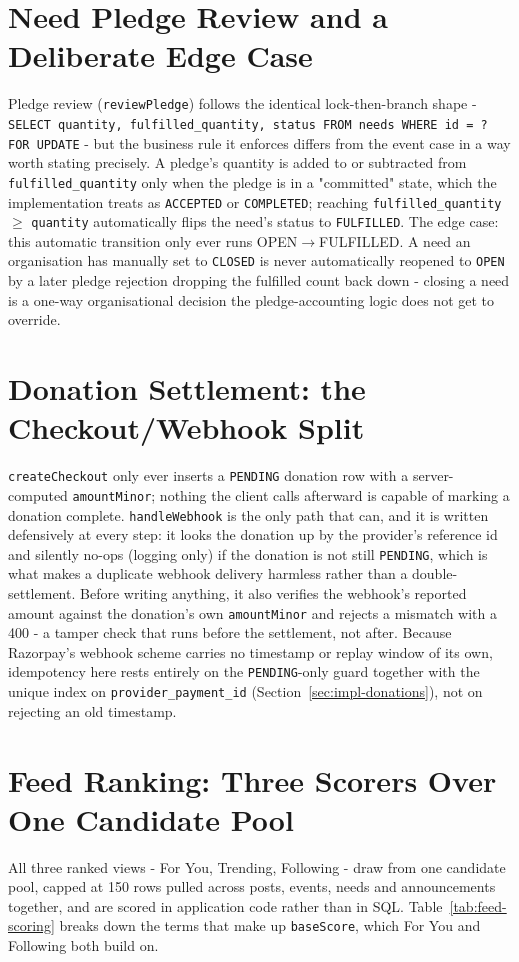 \section{Need Pledge Review and a Deliberate Edge Case}
\label{sec:deepdive-needs}
Pledge review (\texttt{reviewPledge}) follows the identical lock-then-branch shape - \texttt{SELECT quantity, fulfilled\_quantity, status FROM needs WHERE id = ? FOR UPDATE} - but the business rule it enforces differs from the event case in a way worth stating precisely. A pledge's quantity is added to or subtracted from \texttt{fulfilled\_quantity} only when the pledge is in a "committed" state, which the implementation treats as \texttt{ACCEPTED} or \texttt{COMPLETED}; reaching \texttt{fulfilled\_quantity} $\geq$ \texttt{quantity} automatically flips the need's status to \texttt{FULFILLED}. The edge case: this automatic transition only ever runs OPEN$\to$FULFILLED. A need an organisation has manually set to \texttt{CLOSED} is never automatically reopened to \texttt{OPEN} by a later pledge rejection dropping the fulfilled count back down - closing a need is a one-way organisational decision the pledge-accounting logic does not get to override.

\section{Donation Settlement: the Checkout/Webhook Split}
\label{sec:deepdive-donations}
\texttt{createCheckout} only ever inserts a \texttt{PENDING} donation row with a server-computed \texttt{amountMinor}; nothing the client calls afterward is capable of marking a donation complete. \texttt{handleWebhook} is the only path that can, and it is written defensively at every step: it looks the donation up by the provider's reference id and silently no-ops (logging only) if the donation is not still \texttt{PENDING}, which is what makes a duplicate webhook delivery harmless rather than a double-settlement. Before writing anything, it also verifies the webhook's reported amount against the donation's own \texttt{amountMinor} and rejects a mismatch with a 400 - a tamper check that runs before the settlement, not after. Because Razorpay's webhook scheme carries no timestamp or replay window of its own, idempotency here rests entirely on the \texttt{PENDING}-only guard together with the unique index on \texttt{provider\_payment\_id} (Section~\ref{sec:impl-donations}), not on rejecting an old timestamp.

\section{Feed Ranking: Three Scorers Over One Candidate Pool}
\label{sec:deepdive-feed}
All three ranked views - For You, Trending, Following - draw from one candidate pool, capped at 150 rows pulled across posts, events, needs and announcements together, and are scored in application code rather than in SQL. Table~\ref{tab:feed-scoring} breaks down the terms that make up \texttt{baseScore}, which For You and Following both build on.

